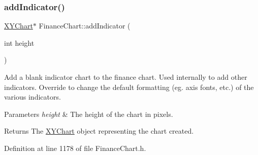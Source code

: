 \subsubsection{\texorpdfstring{add\+Indicator()}{addIndicator()}}
{\footnotesize\ttfamily \hyperlink{class_x_y_chart}{X\+Y\+Chart}$\ast$ Finance\+Chart\+::add\+Indicator (\begin{DoxyParamCaption}\item[{int}]{height }\end{DoxyParamCaption})\hspace{0.3cm}{\ttfamily [inline]}}



Add a blank indicator chart to the finance chart. Used internally to add other indicators. Override to change the default formatting (eg. axis fonts, etc.) of the various indicators. 


\begin{DoxyParams}{Parameters}
{\em height} & The height of the chart in pixels.\\
\hline
\end{DoxyParams}
\begin{DoxyReturn}{Returns}
The \hyperlink{class_x_y_chart}{X\+Y\+Chart} object representing the chart created.
\end{DoxyReturn}


Definition at line 1178 of file Finance\+Chart.\+h.

